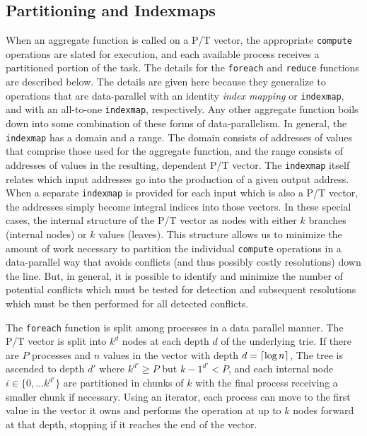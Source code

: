 \subsection{Partitioning and Indexmaps}
When an aggregate function is called on a P/T vector, the appropriate \texttt{compute} 
operations are slated for execution, and each available process receives a partitioned 
portion of the task. The details for the \texttt{foreach} and \texttt{reduce} functions 
are described below. The details are given here because they generalize to operations 
that are data-parallel with an identity \textit{index mapping} or \texttt{indexmap}, and with an 
all-to-one \texttt{indexmap}, respectively. Any other aggregate function boils down into some 
combination of these forms of data-parallelism. In general, the \texttt{indexmap} has a domain 
and a range. The domain consists of addresses of values that comprise those used for 
the aggregate function, and the range consists of addresses of values in the resulting, 
dependent P/T vector. The \texttt{indexmap} itself relates which input addresses 
go into the production of a given output address. When a separate \texttt{indexmap} is 
provided for each input which is also a P/T vector, the addresses simply become integral 
indices into those vectors. In these special cases, the internal structure of the P/T 
vector as nodes with either $k$ branches (internal nodes) or $k$ values (leaves). This 
structure allows us to minimize the amount of work necessary to partition the individual 
\texttt{compute} operations in a data-parallel way that avoids conflicts (and thus 
possibly costly resolutions) down the line. But, in general, it is possible to identify 
and minimize the number of potential conflicts which must be tested for detection and 
subsequent resolutions which must be then performed for all detected conflicts.

The \texttt{foreach} function is split among processes in a data parallel
manner. The P/T vector is split into $k^d$ nodes at each depth $d$  of the
underlying trie. If there are $P$ processes and $n$ values in the vector with
depth $d = \lceil\log{n}\rceil$, The tree is ascended to depth $d'$ where $k^{d'} \geq P$
but ${k-1}^{d'} < P$, and each internal node $i \in \{0, \dots k^{d'}\}$ are
partitioned in chunks of $k$ with the final process receiving a smaller chunk if
necessary. Using an iterator, each process can move to the first value in the
vector it owns and performs the operation at up to $k$ nodes forward at that
depth, stopping if it reaches the end of the vector.

